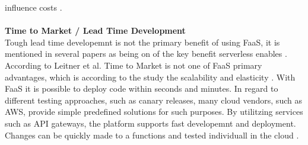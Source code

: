 \documentclass[11pt]{article}
\begin{document}
influence costs \cite{elgamal2018costless}.\\\\ \textbf{Time to Market / Lead Time Development}\\ Tough lead time developemnt is not the primary benefit of using FaaS, it is mentioned in several papers as being on of the key benefit serverless enables \cite{adzic2017serverless} \cite{ast2017self}. According to Leitner et al. Time to Market is not one of FaaS primary advantages, which is according to the study the scalability and elasticity \cite{leitner2019mixed}. With FaaS it is possible to deploy code within seconds and minutes. In regard to different testing approaches, such as canary releases, many cloud vendors, such as AWS, provide simple predefined solutions for such purposes. By utilitzing services such as API gateways, the platform supports fast developemnt and deployment. Changes can be quickly made to a functions and tested individuall in the cloud \cite{sewak2018winning}.\\\\
\end{document}
